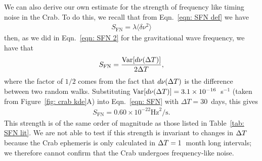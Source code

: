 \documentclass[../full_thesis/full_thesis.tex]{subfiles}
\begin{document}
{We can also derive our own estimate for the strength of frequency like timing noise
in the Crab. To do this, we recall that from Eqn.~\eqref{eqn: SFN def} we have
\begin{align}
S_{\textrm{FN}} = \lambda \langle \delta \nu^{2}\rangle
\end{align}
then, as we did in Eqn.~\eqref{eqn: SFN 2} for the gravitational wave frequency,
we have that
\begin{align}
S_{\textrm{FN}} = \frac{\textrm{Var}[d\nu(\Delta T)]}{2\Delta T},
\label{eqn: SFN}
\end{align}
where the factor of $1/2$ comes from the fact that $d\nu(\Delta T)$ is the
difference between two random walks. Substituting
$\textrm{Var}[d\nu(\Delta T)]=3.1\times10^{-16}$~s$^{-1}$ (taken from Figure~\ref{fig: crab
kde}A) into Eqn.~\eqref{eqn: SFN} with $\Delta T = 30$~days, this gives
\begin{align}
S_{\mathrm{FN}} = 0.60 \times 10^{-22} \textrm{Hz}^{2}/\textrm{s}.
\label{eqn: SFN mine}
\end{align} 
This strength is of the
same order of magnitude as those listed in Table~\ref{tab: SFN lit}. We are not
able to test if this strength is invariant to changes in $\Delta T$ because the
Crab ephemeris is only calculated in $\Delta T=1$~month long intervals; we therefore
cannot confirm that the Crab undergoes frequency-like noise.

}
\end{document}
